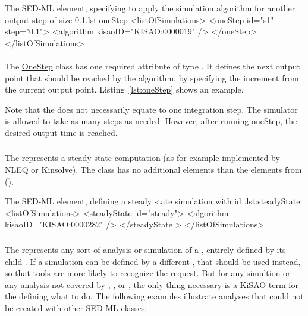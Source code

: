 
\begin{myXmlLst}{The SED-ML  element, specifying to apply the simulation algorithm for another output step of size 0.1.}{lst:oneStep}
<listOfSimulations> 
	<oneStep id="s1" step="0.1"> 
		<algorithm kisaoID="KISAO:0000019" />
	</oneStep> 
</listOfSimulations>
\end{myXmlLst}

\paragraph*{}
\label{sec:step}
The \hyperref[class:oneStep]{OneStep} class has one required attribute  of type . It defines the next output point that should be reached by the algorithm, by specifying the increment from the current output point. Listing~\ref{lst:oneStep} shows an example. 

Note that the  does not necessarily equate to one integration step. The simulator is allowed to take as many steps as needed. However, after running oneStep, the desired output time is reached.


\subsubsection{}
\label{class:steadyState}
The  represents a steady state computation (as for example implemented by NLEQ or Kinsolve). The  class has no additional elements than the elements from \Simulation ().


\begin{myXmlLst}{The SED-ML  element, defining a steady state simulation with id .}{lst:steadyState}
<listOfSimulations>
	<steadyState id="steady"> 
		<algorithm kisaoID="KISAO:0000282" />
	</steadyState > 
</listOfSimulations>
\end{myXmlLst}


\subsubsection{}
\label{class:analysis}
The  represents any sort of analysis or simulation of a \Model, entirely defined by its child \Algorithm.  If a simulation can be defined by a different \Simulation, that should be used instead, so that tools are more likely to recognize the request.  But for any simultion or any analysis not covered by \SteadyState, \OneStep, or \UniformTimeCourse, the only thing necessary is a KiSAO term for the \Algorithm defining what to do.  The following examples illustrate analyses that could not be created with other SED-ML \Simulation classes:

